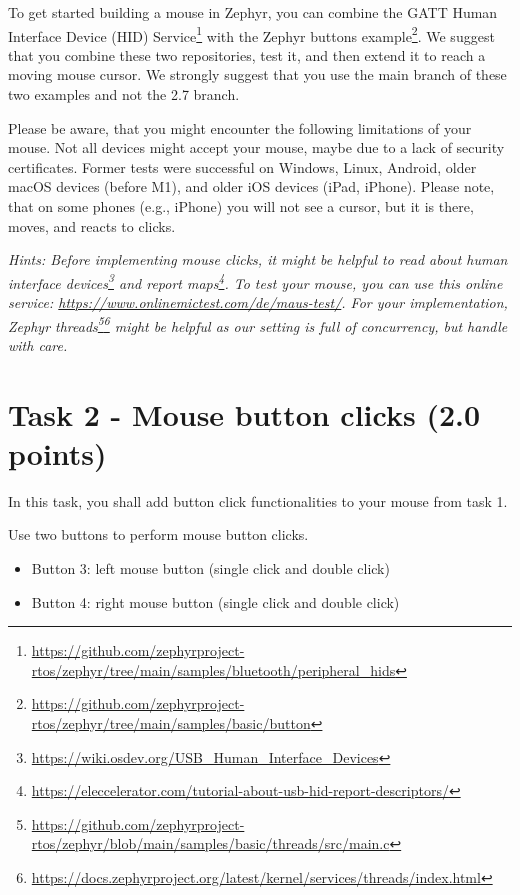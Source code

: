 \documentclass[11pt]{article}
\begin{document}
To get started building a mouse in Zephyr, you can combine the GATT Human Interface Device (HID) Service\footnote{\url{https://github.com/zephyrproject-rtos/zephyr/tree/main/samples/bluetooth/peripheral\_hids}} with the Zephyr buttons example\footnote{\url{https://github.com/zephyrproject-rtos/zephyr/tree/main/samples/basic/button}}. We suggest that you combine these two repositories, test it, and then extend it to reach a moving mouse cursor. We strongly suggest that you use the main branch of these two examples and not the 2.7 branch.

\clearpage

Please be aware, that you might encounter the following limitations of your mouse. Not all devices might accept your mouse, maybe due to a lack of security certificates. Former tests were successful on Windows, Linux, Android, older macOS devices (before M1), and older iOS devices (iPad, iPhone). Please note, that on some phones (e.g., iPhone) you will not see a cursor, but it is there, moves, and reacts to clicks.

\textit{Hints: Before implementing mouse clicks, it might be helpful to read about human interface devices\footnote{\url{https://wiki.osdev.org/USB\_Human\_Interface\_Devices}} and report maps\footnote{\url{https://eleccelerator.com/tutorial-about-usb-hid-report-descriptors/}}. To test your mouse, you can use this online service: \url{https://www.onlinemictest.com/de/maus-test/}. For your implementation, Zephyr threads\footnote{\url{https://github.com/zephyrproject-rtos/zephyr/blob/main/samples/basic/threads/src/main.c}}\footnote{\url{https://docs.zephyrproject.org/latest/kernel/services/threads/index.html}} might be helpful as our setting is full of concurrency, but handle with care.}


\section*{Task 2 - Mouse button clicks (2.0 points)}

In this task, you shall add button click functionalities to your mouse from task 1.

Use two buttons to perform mouse button clicks.

\begin{itemize}
    \item Button 3: left mouse button (single click and double click)
    \item Button 4: right mouse button (single click and double click)
\end{itemize}
\end{document}
